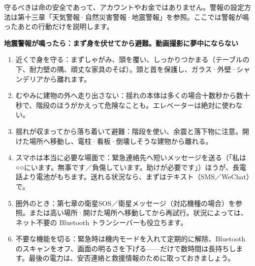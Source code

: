 


守るべきは命の安全であって、アカウントやお金ではありません。警報の設定方法は第十三章「天気警報·自然災害警報·地震警報」を参照。ここでは警報が鳴ったあとの行動だけを説明します。

\textbf{地震警報が鳴ったら：まず身を伏せてから避難。動画撮影に夢中にならない}\par

\begin{enumerate}
  \item 近くで身を守る：まずしゃがみ、頭を覆い、しっかりつかまる（テーブルの下、耐力壁の隅、頑丈な家具のそば）。頭と首を保護し、ガラス·外壁·シャンデリアから離れます。
  \item むやみに建物の外へ走り出さない：揺れの本体は多くの場合十数秒から数十秒で、階段のほうがかえって危険なことも。エレベーターは絶対に使わない。
  \item 揺れが収まってから落ち着いて避難：階段を使い、余震と落下物に注意。開けた場所へ移動し、電柱·看板·倒壊しそうな建物から離れる。
  \item スマホは本当に必要な場面で：緊急連絡先へ短いメッセージを送る（「私は○○にいます。無事です／負傷しています。助けが必要です」）ほうが、長電話より電池がもちます。送れる状況なら、まずはテキスト（SMS／WeChat）で。
  \item 圏外のとき：第七章の衛星SOS／衛星メッセージ（対応機種の場合）を参照。または高い場所·開けた場所へ移動してから再試行。状況によっては、ネット不要の Bluetooth トランシーバーも役立ちます。
  \item 不要な機能を切る：緊急時は機内モードを入れて定期的に解除、Bluetooth のスキャンをオフ、画面の明るさを下げる——だけで数時間は長持ちします。最後の電力は、安否連絡と救援情報のために取っておきましょう。
\end{enumerate}

